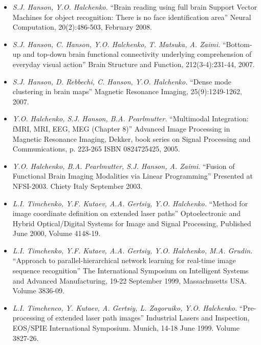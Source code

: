 \documentclass[12pt,overlapped,line]{res}
\newcommand{\mtitle}[1]{``#1''}
\newcommand{\mauthors}[1]{ \textit{#1.}}
\newcommand{\mwhere}[1]{#1.}
\begin{document}
\begin{resume}
\begin{itemize}
  \item
    \mauthors{S.J. Hanson, Y.O. Halchenko}
    \mtitle{Brain reading using full brain Support Vector Machines for
      object recognition: There is no face identification area}
    \mwhere{Neural Computation, 20(2):486-503, February 2008}

  \item
    \mauthors{S.J. Hanson, C. Hanson, Y.O. Halchenko, T. Matsuka, A. Zaimi}
    \mtitle{Bottom-up and top-down brain functional connectivity underlying comprehension of everyday visual action}
    \mwhere{Brain Structure and Function, 212(3-4):231-44, 2007}

  \item
    \mauthors{S.J. Hanson, D. Rebbechi, C. Hanson, Y.O. Halchenko}
    \mtitle{Dense mode clustering in brain maps}
    \mwhere{Magnetic Resonance Imaging, 25(9):1249-1262, 2007}

  \item
    \mauthors{Y.O. Halchenko, S.J. Hanson, B.A. Pearlmutter}
    \mtitle{Multimodal Integration: fMRI, MRI, EEG, MEG (Chapter 8)}
    \mwhere{Advanced Image Processing in Magnetic Resonance Imaging,
      Dekker, book series on Signal Processing and Communications, p. 223-265
      ISBN 0824725425, 2005}

  \item
     \mauthors{Y.O. Halchenko, B.A. Pearlmutter, S.J. Hanson, A. Zaimi}
     \mtitle{Fusion of Functional Brain Imaging Modalities via Linear Programming}
     \mwhere{Presented at NFSI-2003. Chiety Italy September 2003}

  \item
     \mauthors{L.I. Timchenko, Y.F. Kutaev, A.A. Gertsiy, Y.O. Halchenko}
     \mtitle{Method for image coordinate definition on extended laser paths}
     \mwhere{Optoelectronic and Hybrid Optical/Digital Systems for Image and Signal Processing, Published June 2000,  Volume 4148-19}

  \item
     \mauthors{L.I. Timchenko, Y.F. Kutaev, A.A. Gertsiy, Y.O. Halchenko,
     M.A. Grudin}
     \mtitle{Approach to parallel-hierarchical network learning for real-time image sequence recognition}
     \mwhere{The International Symposium on Intelligent Systems and Advanced Manufacturing, 19-22 September 1999, Massachusetts USA. Volume 3836-09}

   \item
     \mauthors{L.I. Timchenco, Y. Kutaev, A. Gertsiy, L. Zagoruiko, Y.O. Halchenko}
     \mtitle{Pre-processing of extended laser path images}
     \mwhere{Industrial Lasers and Inspection, EOS/SPIE International Symposium. Munich, 14-18 June 1999. Volume 3827-26}


\end{itemize}
\end{resume}
\end{document}
